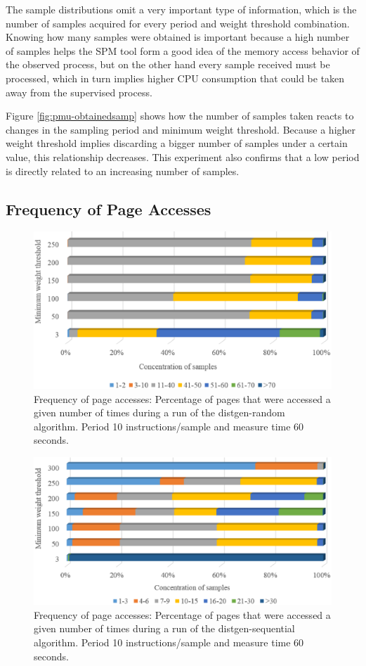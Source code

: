 The sample distributions omit a very important type of information, which is the number of samples acquired for every period and weight threshold combination. Knowing how many samples were obtained is important because a high number of samples helps the SPM tool form a good idea of the memory access behavior of the observed process, but on the other hand every sample received must be processed, which in turn implies higher CPU consumption that could be taken away from the supervised process. 

Figure \ref{fig:pmu-obtainedsamp} shows how the number of samples taken reacts to changes in the sampling period and minimum weight threshold. Because a higher weight threshold implies discarding a bigger number of samples under a certain value, this relationship decreases. This experiment also confirms that a low period is directly related to an increasing number of samples.

\subsection{Frequency of Page Accesses}\label{subsection:pmu-freqpgacc}

\begin{figure}[th]
	\centering
		\includegraphics[width=.8\textwidth]{figures/pagetouch-dgenrdm.eps}
		\caption{Frequency of page accesses: Percentage of pages that were accessed a given number of times during a run of the distgen-random algorithm. Period 10 instructions/sample and measure time 60 seconds.}
		\label{fig:pmu-concentsamp-dgenrdm}
\end{figure}

\begin{figure}[th]
	\centering
		\includegraphics[width=.8\textwidth]{figures/pagetouch-dgenser.eps}
		\caption{Frequency of page accesses: Percentage of pages that were accessed a given number of times during a run of the distgen-sequential algorithm. Period 10 instructions/sample and measure time 60 seconds.}
		\label{fig:pmu-concentsamp-dgenser}
\end{figure}

